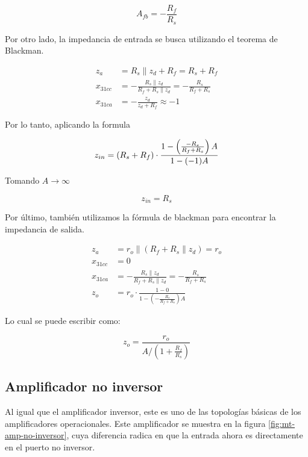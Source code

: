 \begin{equation}
    \boxed{A_{fb} = -\frac{R_f}{R_s}}
    \label{eq:mt-ganancia-amp-inversor}
\end{equation}


Por otro lado, la impedancia de entrada se busca utilizando el teorema de Blackman.

\begin{align*}
z_a &= R_s \parallel z_d + R_f = R_s + R_f \\
x_{31cc} &= -\frac{R_s \parallel z_d}{R_f + R_s \parallel z_d} = -\frac{R_s}{R_f + R_s} \\
x_{31ca} &= -\frac{z_d}{z_d + R_f} \approx -1
\end{align*}


Por lo tanto, aplicando la formula 

\begin{equation*}
z_{in} = (R_s + R_f) \cdot \frac{1 - \left( \frac{-R_s}{R_f + R_s} \right) A}{1 - (-1)A} \\
\end{equation*}

Tomando $A \rightarrow \infty$ 

\begin{equation}
    \boxed{z_{in} = R_s}
\end{equation}

Por último, también utilizamos la fórmula de blackman para encontrar la impedancia de salida.

\begin{align*}
z_a &= r_o \parallel (R_f + R_s \parallel z_d) = r_o \\
x_{31cc} &= 0 \\
x_{31ca} &= -\frac{R_s \parallel z_d}{R_f + R_s \parallel z_d} = -\frac{R_s}{R_f + R_s} \\
z_o &= r_o \cdot \frac{1 - 0}{1 - \left( -\frac{R_s}{R_f + R_s} \right) A} 
\end{align*}

Lo cual se puede escribir como:

\begin{equation}
\boxed{z_o = \frac{r_o}{A / \left( 1 + \frac{R_f}{R_s} \right)}}
\end{equation}

\subsection{Amplificador no inversor}

Al igual que el amplificador inversor, este es uno de las topologías básicas de los amplificadores operacionales. Este amplificador se muestra en la figura \ref{fig:mt-amp-no-inversor}, cuya diferencia radica en que la entrada ahora es directamente en el puerto no inversor.

